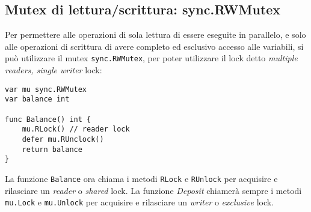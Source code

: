 \documentclass[../../thesis.tex]{subfiles}
\begin{document}
    \subsection{Mutex di lettura/scrittura: sync.RWMutex}\label{subsec:mutex-di-lettura/scrittura:-sync.rwmutex}
    Per permettere alle operazioni di sola lettura di essere eseguite in parallelo, e solo alle operazioni di scrittura di avere completo ed esclusivo accesso alle variabili, si può utilizzare il mutex \verb"sync.RWMutex", per poter utilizzare il lock detto \textit{multiple readers, single writer} lock:
    \begin{lstlisting}[frame = single,label={lst:lstlisting9-3.1}]
var mu sync.RWMutex
var balance int

func Balance() int {
    mu.RLock() // reader lock
    defer mu.RUnclock()
    return balance
}
    \end{lstlisting}
    La funzione \verb"Balance" ora chiama i metodi \verb"RLock" e \verb"RUnlock" per acquisire e rilasciare un \textit{reader} o \textit{shared} lock.
    La funzione \textit{Deposit} chiamerà sempre i metodi \verb"mu.Lock" e \verb"mu.Unlock" per acquisire e rilasciare un \textit{writer} o \textit{exclusive} lock.
\end{document}

